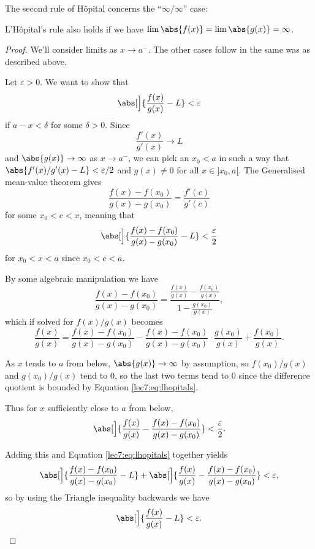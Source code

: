 \noindent
The second rule of H\^{o}pital concerns the ``$\infty / \infty$'' case:

\begin{theorem}
	L'H\^{o}pital's rule also holds if we have $\lim \abs{f(x)} = \lim \abs{g(x)} = \infty$.
\end{theorem}

\begin{proof}
	We'll consider limits as $x \to a^-$. The other cases follow in the same was as described above.

	Let $\varepsilon > 0$. We want to show that
	\[
		\abs[\Big]{\frac{f(x)}{g(x)} - L} < \varepsilon
	\]
	if $a - x < \delta$ for some $\delta > 0$. Since
	\[
		\frac{f'(x)}{g'(x)} \to L
	\]
	and $\abs{g(x)} \to \infty$ as $x \to a^-$, we can pick an $x_0 < a$ in such a way that $\abs{f'(x) / g'(x) - L} < \varepsilon/2$ and $g(x) \neq 0$ for all $x \in {]{x_0, a}[}$. The Generalised mean-value theorem gives
	\[
		\frac{f(x) - f(x_0)}{g(x) - g(x_0)} = \frac{f'(c)}{g'(c)}
	\]
	for some $x_0 < c < x$, meaning that
	\begin{equation}\label{lec7:eq:lhopitals}
		\abs[\Big]{\frac{f(x) - f(x_0)}{g(x) - g(x_0)} - L} < \frac{\varepsilon}{2}
	\end{equation}
	for $x_0 < x < a$ since $x_0 < c < a$.

	By some algebraic manipulation we have
	\[
		\frac{f(x) - f(x_0)}{g(x) - g(x_0)} = \frac{\frac{f(x)}{g(x)} - \frac{f(x_0)}{g(x)}}{1 - \frac{g(x_0)}{g(x)}},
	\]
	which if solved for $f(x)/g(x)$ becomes
	\[
		\frac{f(x)}{g(x)} = \frac{f(x) - f(x_0)}{g(x) - g(x_0)} - \frac{f(x) - f(x_0)}{g(x) - g(x_0)} \cdot \frac{g(x_0)}{g(x)} + \frac{f(x_0)}{g(x)}.
	\]

	\noindent
	As $x$ tends to $a$ from below, $\abs{g(x)} \to \infty$ by assumption, so $f(x_0) / g(x)$ and $g(x_0) / g(x)$ tend to $0$, so the last two terms tend to $0$ since the difference quotient is bounded by Equation \eqref{lec7:eq:lhopitals}.

	Thus for $x$ sufficiently close to $a$ from below,
	\[
		\abs[\Big]{\frac{f(x)}{g(x)} - \frac{f(x) - f(x_0)}{g(x) - g(x_0)}} < \frac{\varepsilon}{2}.
	\]

	\noindent
	Adding this and Equation \eqref{lec7:eq:lhopitals} together yields
	\[
		\abs[\Big]{\frac{f(x) - f(x_0)}{g(x) - g(x_0)} - L} + \abs[\Big]{\frac{f(x)}{g(x)} - \frac{f(x) - f(x_0)}{g(x) - g(x_0)}}  < \varepsilon,
	\]
	so by using the Triangle inequality backwards we have
	\[
		\abs[\Big]{\frac{f(x)}{g(x)} - L} < \varepsilon. \qedhere
	\]
\end{proof}
